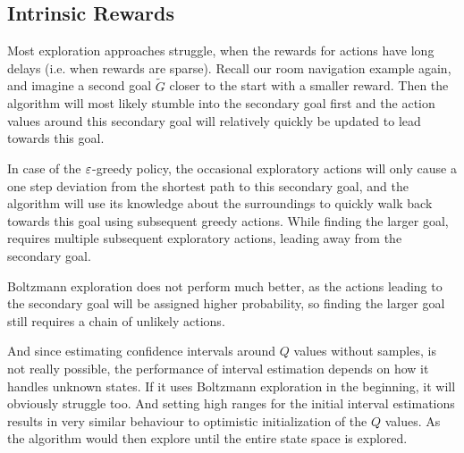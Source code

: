 \subsection{Intrinsic Rewards}
Most exploration approaches struggle, when the rewards for actions have long delays (i.e. when rewards are sparse). Recall our room navigation example again, and imagine a second goal \(\tilde{G}\) closer to the start with a smaller reward. Then the algorithm will most likely stumble into the secondary goal first and the action values around this secondary goal will relatively quickly be updated to lead towards this goal. 

\begin{wrapfigure}{r}{5.5cm}
	\begin{centering}
	\end{centering}
\end{wrapfigure}

In case of the \(\varepsilon\)-greedy policy, the occasional exploratory actions will only cause a one step deviation from the shortest path to this secondary goal, and the algorithm will use its knowledge about the surroundings to quickly walk back towards this goal using subsequent greedy actions. While finding the larger goal, requires multiple subsequent exploratory actions, leading away from the secondary goal. 

Boltzmann exploration does not perform much better, as the actions leading to the secondary goal will be assigned higher probability, so finding the larger goal still requires a chain of unlikely actions. 

And since estimating confidence intervals around \(Q\) values without samples, is not really possible, the performance of interval estimation depends on how it handles unknown states. If it uses Boltzmann exploration in the beginning, it will obviously struggle too. And setting high ranges for the initial interval estimations results in very similar behaviour to optimistic initialization of the \(Q\) values. As the algorithm would then explore until the entire state space is explored. 

